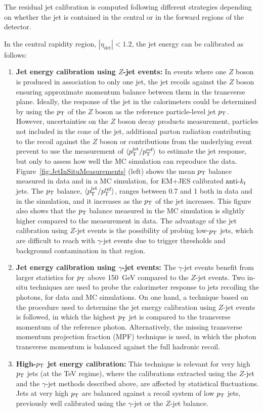 The residual jet calibration is computed following different strategies depending on whether the jet is contained in the central or in the forward regions of the detector.

In the central rapidity region, $|\eta_\text{det}|<1.2$, the jet energy can be calibrated as follows:

\begin{enumerate}
\item{\textbf{Jet energy calibration using $Z$-jet events: }}In events where one $Z$ boson is produced in association to only one jet, the jet recoils against the $Z$ boson ensuring approximate momentum balance between them in the transverse plane.
Ideally, the response of the jet in the calorimeters could be determined by using the $p_{\mathrm{T}}$ of the $Z$ boson as the reference particle-level jet $p_{\mathrm{T}}$.
However, uncertainties on the $Z$ boson decay products measurement, particles not included in the cone of the jet, additional parton radiation contributing to the recoil against the $Z$ boson or contributions from the underlying event prevent to use the measurement of $\langle p_{\mathrm{T}}^{\text{jet}}/p_{\mathrm{T}}^{\text{ref}}\rangle$ to estimate the jet response, but only to assess how well the MC simulation can reproduce the data.
Figure~\ref{fig:JetInSituMeasurements} (left) shows the mean $p_{\mathrm{T}}$ balance measured in data and in a \pythia{} MC simulation, for EM+JES calibrated $\hbox{anti-${k_t}$}$ jets.
The $p_{\mathrm{T}}$ balance, $\langle p_{\mathrm{T}}^{\text{jet}} / p_{\mathrm{T}}^{\text{ref}} \rangle$, ranges between 0.7 and 1 both in data and in the simulation, and it increases as the $p_{\mathrm{T}}$ of the jet increases.
This figure also shows that the $p_{\mathrm{T}}$ balance measured in the MC simulation is slightly higher compared to the measurement in data.
The advantage of the jet calibration using $Z$-jet events is the possibility of probing low-$p_{\mathrm{T}}$ jets, which are difficult to reach with $\gamma$-jet events due to trigger thresholds and background contamination in that region.

\item{\textbf{Jet energy calibration using $\gamma$-jet events: }}The $\gamma$-jet events benefit from larger statistics for $p_{\mathrm{T}}$ above 150~GeV compared to the $Z$-jet events.
Two in-situ techniques are used to probe the calorimeter response to jets recoiling the photons, for data and MC simulations.
On one hand, a technique based on the procedure used to determine the jet energy calibration using $Z$-jet events is followed, in which the highest $p_{\mathrm{T}}$ jet is compared to the transverse momentum of the reference photon.
Alternatively, the missing transverse momentum projection fraction (MPF) technique \cite{Aad:2014bia} is used, in which the photon transverse momentum is balanced against the full hadronic recoil.

\item{\textbf{High-$p_{\mathrm{T}}$ jet energy calibration: }}This technique is relevant for very high $p_{\mathrm{T}}$ jets (at the TeV regime), where the calibrations extracted using the $Z$-jet and the $\gamma$-jet methods described above, are affected by statistical fluctuations.
Jets at very high $p_{\mathrm{T}}$ are balanced against a recoil system of low $p_{\mathrm{T}}$ jets, previously well calibrated using the $\gamma$-jet or the $Z$-jet balance.
\end{enumerate}

